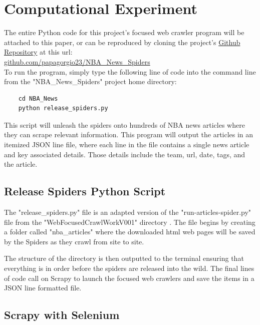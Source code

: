 \documentclass[5p,authoryear]{elsarticle}
\begin{document}
\section{Computational Experiment}

The entire Python code for this project's focused web crawler program will be attached to this paper, or can be reproduced by cloning the project's \href{https://github.com/papagorgio23/NBA_News_Spiders}{Github Repository} at this url:\\

\href{https://github.com/papagorgio23/NBA_News_Spiders}{github.com/papagorgio23/NBA\_News\_Spiders}\\ 

To run the program, simply type the following line of code into the command line from the "NBA\_News\_Spiders" project home directory: 

\begin{lstlisting}
    cd NBA_News
    python release_spiders.py
\end{lstlisting} 

This script will unleash the spiders onto hundreds of NBA news articles where they can scrape relevant information. This program will output the articles in an itemized JSON line file, where each line in the file contains a single news article and key associated details. Those details include the team, url, date, tags, and the article.


\subsection{Release Spiders Python Script}\label{release}

The "release\_spiders.py" file is an adapted version of the "run-articles-spider.py" file from the "WebFocusedCrawlWorkV001" directory \citep{sample-code}. The file begins by creating a folder called "nba\_articles" where the downloaded html web pages will be saved by the Spiders as they crawl from site to site. 

The structure of the directory is then outputted to the terminal ensuring that everything is in order before the spiders are released into the wild. The final lines of code call on Scrapy to launch the focused web crawlers and save the items in a JSON line formatted file. 



\subsection{Scrapy with Selenium}
\end{document}
